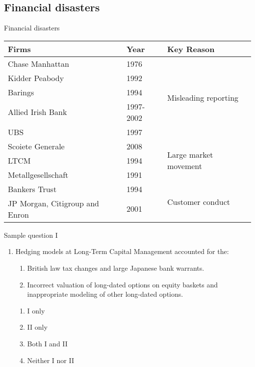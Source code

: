 \subsection{Financial disasters}

\begin{frame}{Financial disasters}

\begin{table}[htbp]
	\centering
	{\small \begin{tabular}{|l|l|l|}
		\hline
		\textbf{Firms} & \textbf{Year} & \textbf{Key Reason} \bigstrut\\
		\hline
		Chase Manhattan & 1976  & \multirow{5}[10]{*}{Misleading reporting} \bigstrut\\
		\cline{1-2}    Kidder Peabody & 1992  &  \bigstrut\\
		\cline{1-2}    Barings & 1994  &  \bigstrut\\
		\cline{1-2}    Allied Irish Bank & 1997-2002 &  \bigstrut\\
		\cline{1-2}    UBS   & 1997  &  \bigstrut\\
		\hline
		Scoiete Generale & 2008  & \multirow{3}[6]{*}{Large market movement} \bigstrut\\
		\cline{1-2}    LTCM  & 1994  &  \bigstrut\\
		\cline{1-2}    Metallgesellschaft & 1991  &  \bigstrut\\
		\hline
		Bankers Trust & 1994  & \multirow{2}[4]{*}{Customer conduct} \bigstrut\\
		\cline{1-2}    JP Morgan, Citigroup and Enron & 2001  &  \bigstrut\\
		\hline
	\end{tabular}}
	\label{tab:disasters}
\end{table}

\end{frame}

\begin{frame}{Sample question I}

\begin{enumerate}
	\item Hedging models at Long-Term Capital Management accounted for the:
	\begin{enumerate}[I]
		\item British law tax changes and large Japanese bank warrants.
		\item Incorrect valuation of long-dated options on equity baskets and inappropriate
		modeling of other long-dated options.
	\end{enumerate}
	\begin{enumerate}[A]
		\item I only
		\item II only
		\item Both I and II
		\item Neither I nor II
	\end{enumerate}
\end{enumerate}

\end{frame}

